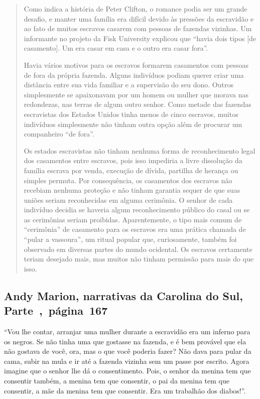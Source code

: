 \begin{quote}
Como indica a história de Peter Clifton, o romance podia ser um
grande desafio, e manter uma família era difícil devido às pressões da
escravidão e ao fato de muitos escravos casarem com pessoas de fazendas
vizinhas. Um informante no projeto da Fisk University explicou que
``havia dois tipos {[}de casamento{]}. Um era casar em casa e o outro
era casar fora''. 

Havia vários motivos para os escravos formarem casamentos com
pessoas de fora da própria fazenda. Alguns indivíduos podiam querer
criar uma distância entre sua vida familiar e a supervisão do seu dono.
Outros simplesmente se apaixonavam por um homem ou mulher que morava nas
redondezas, nas terras de algum outro senhor. Como metade das fazendas
escravistas dos Estados Unidos tinha menos de cinco escravos, muitos
indivíduos simplesmente não tinham outra opção além de procurar um
companheiro ``de fora''.

Os estados escravistas não tinham nenhuma forma de reconhecimento
legal dos casamentos entre escravos, pois isso impediria a livre
dissolução da família escrava por venda, execução de dívida, partilha de
herança ou simples permuta. Por consequência, os casamentos dos escravos
não recebiam nenhuma proteção e não tinham garantia sequer de que suas
uniões seriam reconhecidas em alguma cerimônia. O senhor de cada
indivíduo decidia se haveria algum reconhecimento público do casal ou se
as cerimônias seriam proibidas. Aparentemente, o tipo mais comum de
``cerimônia'' de casamento para os escravos era uma prática chamada de
``pular a vassoura'', um ritual popular que, curiosamente, também foi
observado em diversas partes do mundo ocidental. Os escravos certamente
teriam desejado mais, mas muitos não tinham permissão para mais do que
isso.
\end{quote}

\subsection{Andy Marion, narrativas da Carolina do Sul, Parte~,~página~167}
\label{ref182}

``Vou lhe contar, arranjar uma mulher durante a escravidão era um
inferno para os negros. Se não tinha uma que gostasse na fazenda, e é
bem provável que ela não gostava de você, ora, mas o que você poderia
fazer? Não dava para pular da cama, subir na mula e ir até a fazenda
vizinha sem um passe por escrito. Agora imagine que o senhor lhe dá o
consentimento. Pois, o senhor da menina tem que consentir também, a
menina tem que consentir, o pai da menina tem que consentir, a mãe da
menina tem que consentir. Era um trabalhão dos diabos!''.

